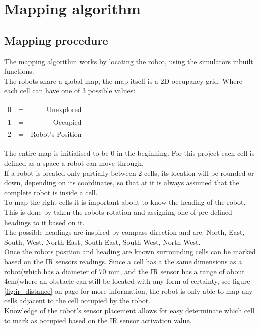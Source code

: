 \section{Mapping algorithm}
\subsection{Mapping procedure}
The mapping algorithm works by locating the robot, using the simulators inbuilt functions. \\
The robots share a global map, the map itself is a 2D occupancy grid. Where each cell can have one of 3 possible values:\\

\begin{table}[h]
\begin{center}
\begin{tabular}{l c r}
0 & = & Unexplored \\
1 & = & Occupied \\
2 & = & Robot's Position \\
\end{tabular}
\end{center}
\end{table}

The entire map is initialised to be 0 in the beginning. For this project each cell is defined as a space a robot can move through. \\
If a robot is located only partially between 2 cells, its location will be rounded or down, depending on its coordinates, so that at it is always assumed that the complete robot is inside a cell.\\

To map the right cells it is important about to know the heading of the robot. This is done by taken the robots rotation and assigning one of pre-defined headings to it based on it. \\
The possible headings are inspired by compass direction and are: North, East, South, West, North-East, South-East, South-West, North-West.\\
Once the robots position and heading are known surrounding cells can be marked based on the IR sensors readings. Since a cell has a the same dimensions as a robot(which has a diameter of 70 mm, and the IR sensor has a range of about 4cm(where an obstacle can still be located with any form of certainty, see figure \ref{fig:ir_distance} on page \pageref{fig:ir_distance} for more information, the robot is only able to map any cells adjacent to the cell occupied by the robot. \\
Knowledge of the robot's sensor placement allows for easy determinate which cell to mark as occupied based on the IR sensor activation value. \\

